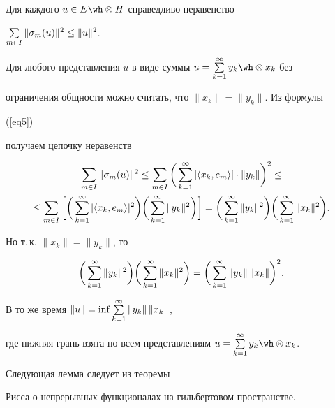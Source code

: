 \begin{lem}


\label{L2}


Для каждого $u \in E \tens H$ справедливо неравенство


$\sum\limits_{m \in I} \| \sigma_m (u)\|^2 \le\| u\|^2$.


\end{lem}





\begin{pf}


Для любого представления $u$ в виде суммы $u=\sumki y_k \tens x_k$ без


ограничения общности можно считать, что $\| x_k\| =\| y_k\|$. Из формулы


(\ref{eq5})


получаем цепочку неравенств


\begin{multline*}


\sumii \|\si_m(u)\|^2\le \sumii \bigg( \sumki


| \lan x_k,e_m \ran | \cd \| y_k \| \bigg)^2 \le \\


%


\le \sumii \bigg[ \bigg


( \sumki | \lan x_k, e_m \ran |^2 \bigg) \bigg( \sumki \| y_k \|^2 \bigg)


\bigg]


= \bigg( \sumki \| y_k \|^2 \bigg) \bigg( \sumki \| x_k \|^2\bigg).


\end{multline*}


Но т.\,к. $\| x_k\| =\| y_k\|$, то


$$


\bigg( \sumki \| y_k \|^2 \bigg)


\bigg( \sumki \| x_k \|^2\bigg)=\bigg( \sumki \| y_k\|\, \| x_k\| \bigg)^2.


$$


В то же время $\| u\| =\inf \sum\limits_{k=1}^\infty \| y_k\|\, \| x_k \| $,


где нижняя грань взята по всем представлениям $u=\sumki y_k \tens x_k$.


\end{pf}





Следующая лемма следует из теоремы


Рисса о непрерывных функционалах на гильбертовом пространстве.





